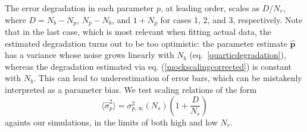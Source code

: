 \documentclass[reprint,aps,prd,superscriptaddress,showkeys,showpacs]{revtex4-1}
\newcommand{\bbh}[1]{\mathbf{\hat{#1}}}
\newcommand{\h}[1]{\hat{#1}}
\begin{document}
%
The error degradation in each parameter $p$, at leading order, scales
as $D/N_r$, where $D=N_b-N_p$, $N_p-N_b$, and $1+N_p$ for cases 1, 2,
and 3, respectively.
Note that in the last case, which is most relevant when fitting actual
data, the estimated degradation turns out to be too optimistic: the
parameter estimate $\bbh{p}$ has a variance whose noise grows linearly
with $N_b$ (eq.~\ref{quarticdegradation}), whereas the degradation
estimated via eq. (\ref{mockscalingcorrected}) is constant with
$N_b$. This can lead to underestimation of error bars, which can be
mistakenly interpreted as a parameter bias. We test scaling
relations of the form
%
\begin{equation}
\label{ourscaling}
\langle\h{\sigma}_p^2\rangle = \sigma^2_{p,\infty}(N_s)\left(1+\frac{D}{N_r}\right)
\end{equation}
%
againts our simulations, in the limits of both high and low $N_r$.
\end{document}
